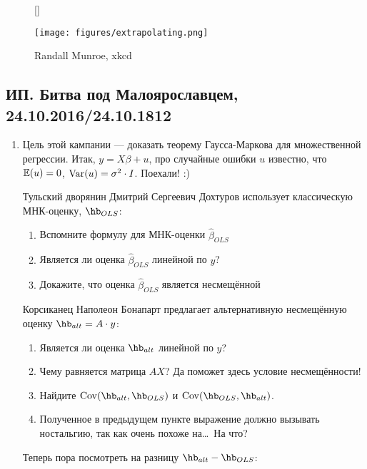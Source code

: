 \documentclass[12pt, a4paper]{article}
\theoremstyle{definition}
\begin{document}
\begin{figure}[h!]
[\FBwidth]
{\caption*{Randall Munroe, xkcd}}
{\texttt{[image: figures/extrapolating.png]}}
\end{figure}

\subsection{ИП. Битва под Малоярославцем, 24.10.2016/24.10.1812}

\begin{enumerate}

\item Цель этой кампании — доказать теорему Гаусса-Маркова для множественной регрессии. Итак, $y=X\beta + u$, про случайные ошибки $u$ известно, что $\mathbb{E}(u)=0$, $\operatorname{Var}(u)=\sigma^2 \cdot I$. Поехали! :)

Тульский дворянин Дмитрий Сергеевич Дохтуров использует классическую МНК-оценку, $\hb_{OLS}$:

\begin{enumerate}
\item Вспомните формулу для МНК-оценки $\hat \beta_{OLS}$
\item Является ли оценка $\hat \beta_{OLS}$ линейной по $y$?
\item Докажите, что оценка $\hat \beta_{OLS}$ является несмещённой
\end{enumerate}

Корсиканец Наполеон Бонапарт предлагает альтернативную несмещённую оценку $\hb_{alt} = A\cdot y$:

\begin{enumerate}[resume]
\item Является ли оценка $\hb_{alt}$ линейной по $y$?
\item Чему равняется матрица $AX$? Да поможет здесь условие несмещённости!
\item Найдите $\Cov(\hb_{alt}, \hb_{OLS})$ и $\Cov(\hb_{OLS}, \hb_{alt})$.
\item Полученное в предыдущем пункте выражение должно вызывать ностальгию, так как очень похоже на\ldots~На что?
\end{enumerate}

Теперь пора посмотреть на разницу $\hb_{alt} - \hb_{OLS}$:


\end{enumerate}
\end{document}
